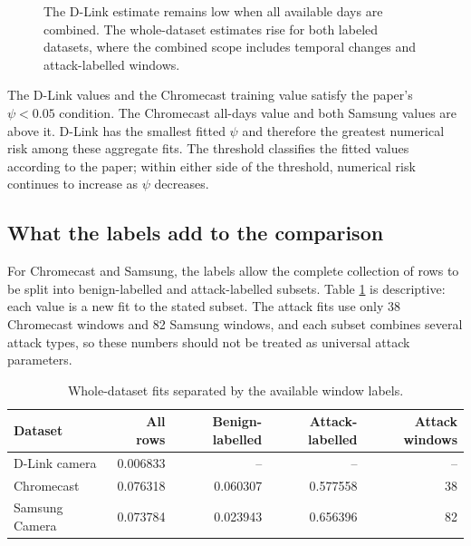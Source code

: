 \documentclass[11pt]{article}
\begin{document}
\begin{figure}[htbp]
\centering
{}
\caption{The D-Link estimate remains low when all available days are combined.
The whole-dataset estimates rise for both labeled datasets, where the combined
scope includes temporal changes and attack-labelled windows.}
\label{fig:aggregate-psi}
\end{figure}

The D-Link values and the Chromecast training value satisfy the paper's
\(\psi<0.05\) condition. The Chromecast all-days value and both Samsung values
are above it. D-Link has the smallest fitted \(\psi\) and therefore the greatest
numerical risk among these aggregate fits. The threshold classifies the fitted
values according to the paper; within either side of the threshold, numerical
risk continues to increase as \(\psi\) decreases.

\subsection{What the labels add to the comparison}

For Chromecast and Samsung, the labels allow the complete collection of rows
to be split into benign-labelled and attack-labelled subsets. Table
\ref{tab:label-split} is descriptive: each value is a new fit to the stated
subset. The attack fits use only 38 Chromecast windows and 82 Samsung windows,
and each subset combines several attack types, so these numbers should not be
treated as universal attack parameters.

\begin{table}[htbp]
\centering
\caption{Whole-dataset fits separated by the available window labels.}
\label{tab:label-split}
\begin{tabular}{lrrrr}
\toprule
Dataset & All rows & Benign-labelled & Attack-labelled & Attack windows \\
\midrule
D-Link camera & 0.006833 & -- & -- & -- \\
Chromecast & 0.076318 & 0.060307 & 0.577558 & 38 \\
Samsung Camera & 0.073784 & 0.023943 & 0.656396 & 82 \\
\bottomrule
\end{tabular}
\end{table}
\end{document}
